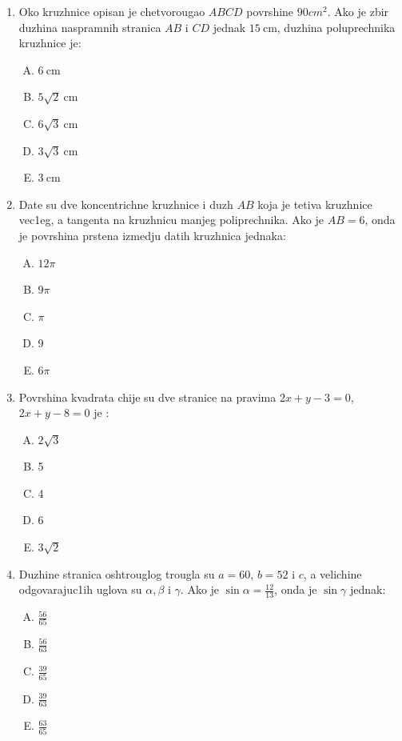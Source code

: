 \documentclass[a4paper,12pt]{article}
\newcommand{\Lat}{\fontencoding{OT1}\selectfont}
\begin{document}
\begin{enumerate}[1.]
\item Oko kruzhnice opisan je chetvorougao $ABCD$ povrshine $90cm^2$. Ako je zbir duzhina naspramnih stranica $AB$ i $CD$ jednak $15\mathrm{\ cm}$, duzhina poluprechnika kruzhnice je: 
{\Lat
\begin{multicols}{5}
\begin{enumerate}[A)]
\item $6\mathrm{\ cm}$ \item $5\sqrt{2}\mathrm{\ cm}$ \item $6\sqrt{3}\mathrm{\ cm}$ \item $3\sqrt{3}\mathrm{\ cm}$ \item $3\mathrm{\ cm}$
\end{enumerate}
\end{multicols}
}

\item Date su dve koncentrichne kruzhnice i duzh $AB$ koja je tetiva kruzhnice vec1eg, a tangenta na kruzhnicu manjeg poliprechnika. Ako je $AB = 6$, onda je povrshina prstena izmedju datih kruzhnica jednaka: 
{\Lat
\begin{multicols}{5}
\begin{enumerate}[A)]
\item $12\pi$  \item $9\pi$ \item $\pi$ \item 9 \item $6\pi$
\end{enumerate}
\end{multicols}
}

\item Povrshina kvadrata chije su dve stranice na pravima $2x + y - 3 = 0$, $2x +y -8 = 0$ je :
{\Lat
\begin{multicols}{5}
\begin{enumerate}[A)]
\item $2\sqrt{3}$  \item 5 \item 4 \item 6 \item $3\sqrt{2}$
\end{enumerate}
\end{multicols}
}

\item Duzhine stranica oshtrouglog trougla su $a = 60$, $ b = 52$ i $c$, a velichine odgovarajuc1ih uglova su $\alpha,\beta  $ i $\gamma $. Ako je $\sin{\alpha } = \frac{12}{13}$, onda je $\sin{\gamma }$ jednak:
{\Lat
\begin{multicols}{5}
\begin{enumerate}[A)]
\item $\frac{56}{65}$  \item $\frac{56}{63}$ \item $\frac{39}{65}$ \item $\frac{39}{63}$ \item $\frac{63}{65}$
\end{enumerate}
\end{multicols}
}

\end{enumerate}
\end{document}
